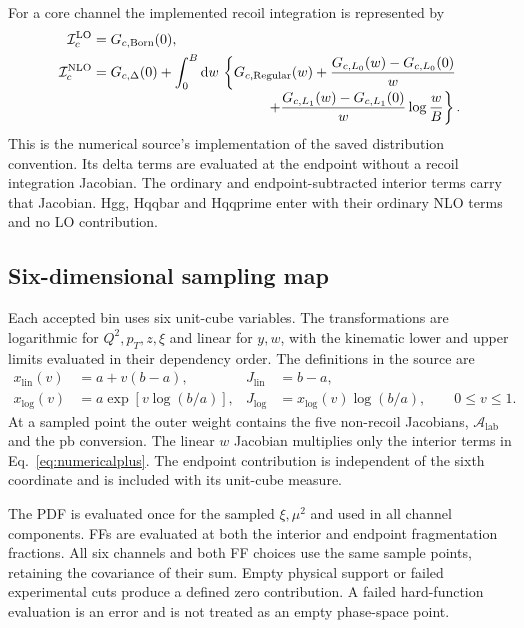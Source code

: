 \documentclass[11pt,a4paper]{article}
\newcommand{\dd}{\mathrm{d}}
\newcommand{\NLO}{\mathrm{NLO}}
\newcommand{\LO}{\mathrm{LO}}
\begin{document}
For a core channel the implemented recoil integration is represented by
\begin{align}
 \mathcal I_{c}^{\LO}={}&G_{c,\mathrm{Born}}(0),\\
 \mathcal I_{c}^{\NLO}={}&G_{c,\Delta}(0)
 +\int_0^B\dd w\,\left\{
 G_{c,\mathrm{Regular}}(w)
 +\frac{G_{c,L_0}(w)-G_{c,L_0}(0)}{w}\right.
 \nonumber\\[-1mm]
 &\hspace{39mm}\left.
 +\frac{G_{c,L_1}(w)-G_{c,L_1}(0)}{w}\log\frac{w}{B}
 \right\}.
 \label{eq:numericalplus}
\end{align}
This is the numerical source's implementation of the saved distribution
convention. Its delta terms are evaluated at the endpoint without a
recoil integration Jacobian. The ordinary and endpoint-subtracted
interior terms carry that Jacobian. Hgg, Hqqbar and Hqqprime enter with
their ordinary NLO terms and no LO contribution.

\subsection{Six-dimensional sampling map}

Each accepted bin uses six unit-cube variables. The transformations are
logarithmic for $Q^2,p_T,z,\xi$ and linear for $y,w$, with the
kinematic lower and upper limits evaluated in their dependency order.
The definitions in the source are
\begin{align}
 x_{\mathrm{lin}}(v)&=a+v(b-a),&
 J_{\mathrm{lin}}&=b-a,\\
 x_{\log}(v)&=a\exp[v\log(b/a)],&
 J_{\log}&=x_{\log}(v)\log(b/a),\qquad 0\leq v\leq1.
\end{align}
At a sampled point the outer weight contains the five non-recoil
Jacobians, $\mathcal A_{\mathrm{lab}}$ and the pb conversion. The
linear $w$ Jacobian multiplies only the interior terms in
Eq.~\eqref{eq:numericalplus}. The endpoint contribution is independent
of the sixth coordinate and is included with its unit-cube measure.

The PDF is evaluated once for the sampled $\xi,\mu^2$ and used in
all channel components. FFs are evaluated at both the interior and
endpoint fragmentation fractions. All six channels and both FF choices
use the same sample points, retaining the covariance of their sum.
Empty physical support or failed experimental cuts produce a defined
zero contribution. A failed hard-function evaluation is an error and
is not treated as an empty phase-space point.
\end{document}

